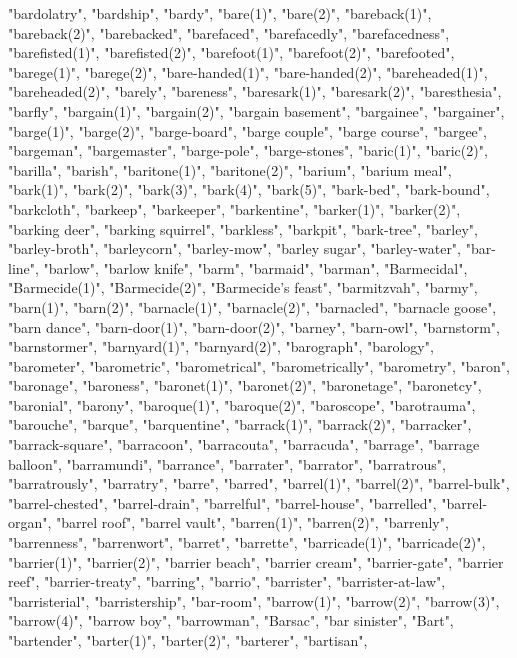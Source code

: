 "bardolatry",
"bardship",
"bardy",
"bare(1)",
"bare(2)",
"bareback(1)",
"bareback(2)",
"barebacked",
"barefaced",
"barefacedly",
"barefacedness",
"barefisted(1)",
"barefisted(2)",
"barefoot(1)",
"barefoot(2)",
"barefooted",
"barege(1)",
"barege(2)",
"bare-handed(1)",
"bare-handed(2)",
"bareheaded(1)",
"bareheaded(2)",
"barely",
"bareness",
"baresark(1)",
"baresark(2)",
"baresthesia",
"barfly",
"bargain(1)",
"bargain(2)",
"bargain basement",
"bargainee",
"bargainer",
"barge(1)",
"barge(2)",
"barge-board",
"barge couple",
"barge course",
"bargee",
"bargeman",
"bargemaster",
"barge-pole",
"barge-stones",
"baric(1)",
"baric(2)",
"barilla",
"barish",
"baritone(1)",
"baritone(2)",
"barium",
"barium meal",
"bark(1)",
"bark(2)",
"bark(3)",
"bark(4)",
"bark(5)",
"bark-bed",
"bark-bound",
"barkcloth",
"barkeep",
"barkeeper",
"barkentine",
"barker(1)",
"barker(2)",
"barking deer",
"barking squirrel",
"barkless",
"barkpit",
"bark-tree",
"barley",
"barley-broth",
"barleycorn",
"barley-mow",
"barley sugar",
"barley-water",
"bar-line",
"barlow",
"barlow knife",
"barm",
"barmaid",
"barman",
"Barmecidal",
"Barmecide(1)",
"Barmecide(2)",
"Barmecide's feast",
"barmitzvah",
"barmy",
"barn(1)",
"barn(2)",
"barnacle(1)",
"barnacle(2)",
"barnacled",
"barnacle goose",
"barn dance",
"barn-door(1)",
"barn-door(2)",
"barney",
"barn-owl",
"barnstorm",
"barnstormer",
"barnyard(1)",
"barnyard(2)",
"barograph",
"barology",
"barometer",
"barometric",
"barometrical",
"barometrically",
"barometry",
"baron",
"baronage",
"baroness",
"baronet(1)",
"baronet(2)",
"baronetage",
"baronetcy",
"baronial",
"barony",
"baroque(1)",
"baroque(2)",
"baroscope",
"barotrauma",
"barouche",
"barque",
"barquentine",
"barrack(1)",
"barrack(2)",
"barracker",
"barrack-square",
"barracoon",
"barracouta",
"barracuda",
"barrage",
"barrage balloon",
"barramundi",
"barrance",
"barrater",
"barrator",
"barratrous",
"barratrously",
"barratry",
"barre",
"barred",
"barrel(1)",
"barrel(2)",
"barrel-bulk",
"barrel-chested",
"barrel-drain",
"barrelful",
"barrel-house",
"barrelled",
"barrel-organ",
"barrel roof",
"barrel vault",
"barren(1)",
"barren(2)",
"barrenly",
"barrenness",
"barrenwort",
"barret",
"barrette",
"barricade(1)",
"barricade(2)",
"barrier(1)",
"barrier(2)",
"barrier beach",
"barrier cream",
"barrier-gate",
"barrier reef",
"barrier-treaty",
"barring",
"barrio",
"barrister",
"barrister-at-law",
"barristerial",
"barristership",
"bar-room",
"barrow(1)",
"barrow(2)",
"barrow(3)",
"barrow(4)",
"barrow boy",
"barrowman",
"Barsac",
"bar sinister",
"Bart",
"bartender",
"barter(1)",
"barter(2)",
"barterer",
"bartisan",
